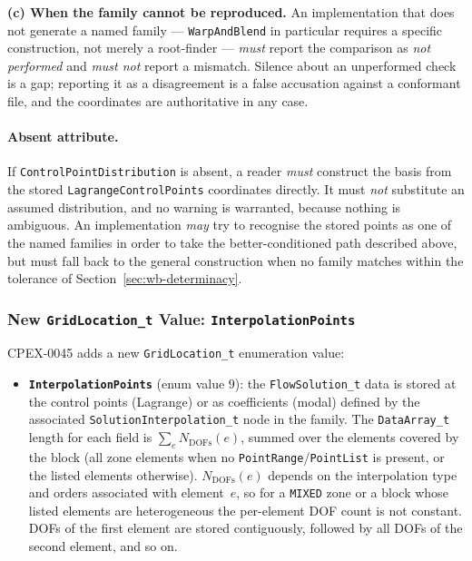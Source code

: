 \documentclass[11pt,letterpaper]{article}
\newif\ifvfourdraft
\newcommand{\vfour}[1]{\ifvfourdraft\textcolor{v4violet}{#1}\else#1\fi}
\newenvironment{v4block}{\ifvfourdraft\color{v4violet}\fi\ignorespaces}{\par}
\begin{document}
\begin{v4block}
\noindent\textbf{(c) When the family cannot be reproduced.}  An implementation
that does not generate a named family --- \texttt{WarpAndBlend} in particular
requires a specific construction, not merely a root-finder --- \emph{must} report
the comparison as \emph{not performed} and \emph{must not} report a mismatch.
Silence about an unperformed check is a gap; reporting it as a disagreement is a
false accusation against a conformant file, and the coordinates are authoritative
in any case.
\end{v4block}

\paragraph{Absent attribute.}
If \texttt{ControlPointDistribution} is absent, a reader \emph{must} construct the
basis from the stored \texttt{LagrangeControlPoints} coordinates directly.  It must
\emph{not} substitute an assumed distribution, and no warning is warranted, because nothing
is ambiguous.  An implementation \emph{may} try to recognise the stored points as one of the
named families in order to take the better-conditioned path described above, but must fall
back to the general construction when no family matches within the tolerance
\vfour{of Section~\ref{sec:wb-determinacy}}.

\subsubsection{New \texttt{GridLocation\_t} Value: \texttt{InterpolationPoints}}
\label{sec:interpolation-points-loc}

CPEX-0045 adds a new \texttt{GridLocation\_t} enumeration value:
{\sloppy
\begin{itemize}
  \item \textbf{\texttt{InterpolationPoints}} (enum value $9$): the
    \texttt{FlowSolution\_t} data is stored at the control points (Lagrange) or as
    coefficients (modal) defined by the associated \texttt{SolutionInterpolation\_t} node in
    the family.  The \texttt{DataArray\_t} length for each field is
    $\sum_{e} N_\mathrm{DOFs}(e)$, summed over the elements covered by the block
    (all zone elements when no \texttt{PointRange}/\texttt{PointList} is present, or
    the listed elements otherwise).  $N_\mathrm{DOFs}(e)$ depends on the interpolation
    type and orders associated with element~$e$, so for a \texttt{MIXED} zone or a
    block whose listed elements are heterogeneous the per-element DOF count is not
    constant.  DOFs of the first element are stored contiguously, followed by all
    DOFs of the second element, and so on.
\end{itemize}
\par}
\end{document}
